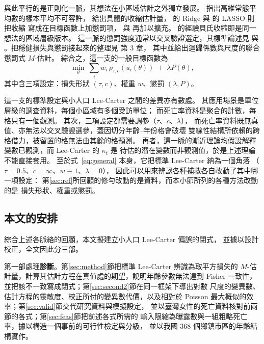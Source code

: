 \documentclass[UTF8, fontset=macnew, a4paper, 12pt]{ctexart}
\begin{document}
與此平行的是正則化一脈，其想法在小區域估計之外獨立發展。
\citet{stein1956} 指出高維常態平均數的樣本平均不可容許，
\citet{james1961} 給出具體的收縮估計量，
\citet{hoerl1970} 的 Ridge 與 \citet{tibshirani1996} 的 LASSO 則把收縮
寫成在目標函數上加懲罰項，\citet{zou2005} 與 \citet{zou2006} 再加以擴充。
\citet{fay1979} 的經驗貝氏收縮即是同一想法的區域層級版本。
這一脈的懲罰強度通常以交叉驗證選定，其標準論述見 \citet{buhlmann2011} 與
\citet{hastie2015}。把穩健損失與懲罰接起來的整理見 \citet{zoubir2018} 第 3 章，
其中並給出迴歸係數與尺度的聯合懲罰式 $M$-估計。
綜合之，這一支的一般目標函數為
\begin{equation}\label{eq:general}
\min_{\theta}\ \sum_{i} w_i\,\rho_{\tau,c}(u_i(\theta))\;+\;\lambda P(\theta),
\end{equation}
其中含三項設定：損失形狀 $(\tau,c)$、權重 $w$、懲罰 $(\lambda,P)$。

這一支的標準設定與小人口 Lee-Carter 之間的差異亦有數處。
其應用場景是單位層級的調查資料，每個小區域有多個受訪單位；
而死亡率資料是聚合的計數，每格只有一個觀測。
其次，三項設定都需要調參（$\tau$、$c$、$\lambda$），
而死亡率資料既無真值、亦無法以交叉驗證選參，蓋因切分年齡--年份格會破壞
雙線性結構所依賴的跨格借力，被留置的格無法由其餘的格預測。
再者，這一脈的漸近理論均假設解釋變數已觀測，而 Lee-Carter 的 $\kappa_t$ 是
待估的潛在變數而非觀測值，於是上述理論不能直接套用。
至於式~\eqref{eq:general} 本身，它把標準 Lee-Carter 納為一個角落
（$\tau=0.5$、$c=\infty$、$w\equiv1$、$\lambda=0$），
因此可以用來辨認各種補救各自改動了其中哪一項設定：
第\ref{sec:ref}所回顧的修勻改動的是資料，而本小節所列的各種方法改動的是
損失形狀、權重或懲罰。

\subsection{本文的安排}\label{sec:roadmap}

綜合上述各脈絡的回顧，本文擬建立小人口 Lee-Carter 偏誤的閉式，
並據以設計校正，全文因此分三部。

第一部處理\textbf{診斷}。第\ref{sec:method}節把標準 Lee-Carter 辨識為取平方損失的
$M$-估計量，計算其估計方程在真值處的期望，說明年齡參數無法達到 Fisher
一致性，並把該不一致寫成閉式；第\ref{sec:second2}節在同一框架下導出對數
尺度的變異數、估計方程的靈敏度、校正所付的變異數代價，以及相對於 Poisson
最大概似的效率；第\ref{sec:valid}節交代研究資料與模擬設定，
並以臺灣女性的死亡資料核對前兩節的各式；第\ref{sec:feas}節把前述各式所需的
輸入限縮為曝露數與一組粗略死亡率，據以構造一個事前的可行性檢定與分級，
並以我國 368 個鄉鎮市區的年齡結構實作。
\end{document}
